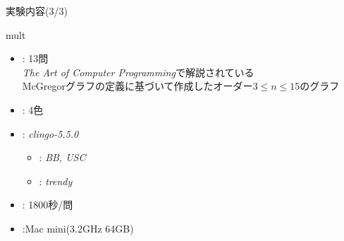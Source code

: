 \documentclass[dvipdfmx,11pt]{beamer}
\begin{document}

\begin{frame}{実験内容(3/3)}
 \begin{block}{mult}
  \begin{itemize}
   \item {}: 13問 \\
         \textit{The Art of Computer Programming}で解説されている \\
         McGregorグラフの定義に基づいて作成したオーダー$3 \leq n \leq 15$のグラフ
   \item {}: 4色
   \item {}: \textit{clingo-5.5.0}
         \begin{itemize}
          \item {}: \textit{BB, USC}
          \item {}: \textit{trendy}
         \end{itemize}
   \item {}: 1800秒/問
   \item {}:Mac mini(3.2GHz 64GB)
  \end{itemize}
 \end{block}
\end{frame}

\end{document}
